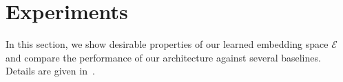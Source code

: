 \documentclass{article}
\newcommand{\TODO}[1]{\textcolor{red}{\textbf{TODO: #1}}}
\newcommand{\cA}{\mathcal{A}}
\newcommand{\cS}{\mathcal{S}}
\newcommand{\blind}{\emph{blind}}
\newcommand{\plain}{\emph{plain}}
\newcommand{\idvar}{d}
\newcommand{\latset}{\mathcal{E}}
\begin{document}

\vspace{-0.2cm}
\section{Experiments}
\vspace{-0.2cm}

In this section, we show desirable properties of our learned embedding space $\latset$
and compare the performance of our architecture against several baselines.
Details are given in~.

\end{document}
